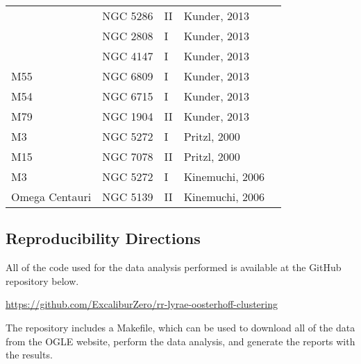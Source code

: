 \documentclass[]{article}
\begin{document}
\begin{longtable}{
	p{1.5cm}|
	p{2.5cm}|
	p{2.5cm}|
	p{3.7cm}|
	p{5.5cm}
	@{}}
		& NGC 5286     & II         & Kunder, 2013         &                                                                        \\
		& NGC 2808     & I          & Kunder, 2013         &                                                                        \\
		& NGC 4147     & I          & Kunder, 2013         &                                                                        \\
		M55            & NGC 6809     & I          & Kunder, 2013         &                                                                        \\
		M54            & NGC 6715     & I          & Kunder, 2013         &                                                                        \\
		M79            & NGC 1904     & II         & Kunder, 2013         &                                                                        \\
		M3             & NGC 5272     & I          & Pritzl, 2000 \cite{pritzl_2000_a}         &                                                                        \\
		M15            & NGC 7078     & II         & Pritzl, 2000         &                                                                        \\
		M3             & NGC 5272     & I          & Kinemuchi, 2006 \cite{kinemuchi_2006_a}      &                                                                        \\
		Omega Centauri & NGC 5139     & II         & Kinemuchi, 2006      &                                                                       
\end{longtable}

\newpage

\subsection{Reproducibility Directions}
All of the code used for the data analysis performed is available at the GitHub repository below.

\vspace{12pt}

\url{https://github.com/ExcaliburZero/rr-lyrae-oosterhoff-clustering}

\vspace{12pt}

The repository includes a Makefile, which can be used to download all of the data from the OGLE website, perform the data analysis, and generate the reports with the results.
\end{document}
